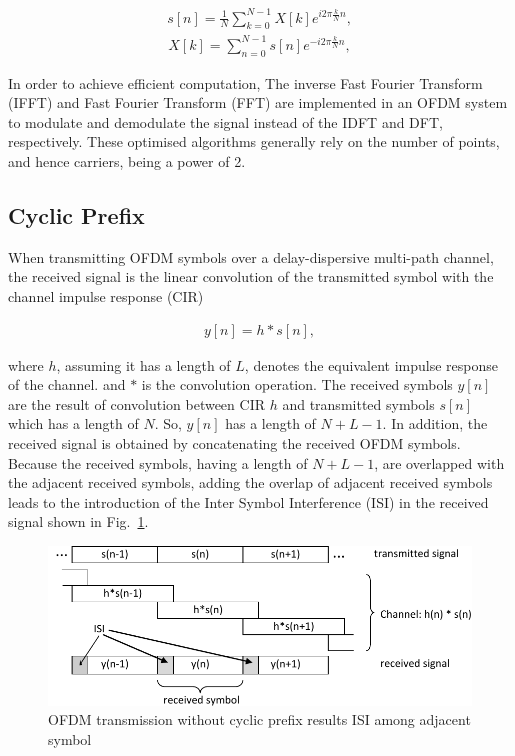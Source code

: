 \begin{eqnarray}
\label{equ:sampledOFDMsignal}
s[n] = \frac{1}{N}\sum_{k=0}^{N-1} X[k] e^{i2\pi\frac{k}{N}n},
\end{eqnarray}
\begin{eqnarray}
\label{equ:sampledOFDMsignal}
X[k] = \sum_{n=0}^{N-1} s[n] e^{-i2\pi\frac{k}{N}n},
\end{eqnarray}

In order to achieve efficient computation, The inverse Fast Fourier Transform (IFFT) and Fast Fourier Transform (FFT) are implemented in an OFDM system to modulate and demodulate the signal instead of the IDFT and DFT, respectively. These optimised algorithms generally rely on the number of points, and hence carriers, being a power of 2.

\subsection{Cyclic Prefix}

When transmitting OFDM symbols over a delay-dispersive multi-path channel, the received signal is the linear convolution of the transmitted symbol with the channel impulse
response (CIR)

\begin{eqnarray}
\label{equ:sampledOFDMsignal}
y[n] = h*s[n],
\end{eqnarray}

where $h$, assuming it has a length of $L$, denotes the equivalent impulse response of the channel. and $*$ is the convolution operation.
The received symbols $y[n]$ are the result of convolution between CIR $h$ and transmitted symbols $s[n]$ which has a length of $N$.
So,  $y[n]$ has a length of $N+L-1$.
In addition, the received signal is obtained by concatenating the received OFDM symbols.
Because the received symbols, having a length of $N+L-1$, are overlapped with the adjacent received symbols, adding the overlap of adjacent received symbols leads to the introduction of the Inter Symbol Interference (ISI) in the received signal shown in Fig.~\ref{fig:CIR-noCP}.


\begin{figure}
	\centerline{\includegraphics [width=0.8\columnwidth] {Figures/CIR_noCP.pdf} }
	\caption{OFDM transmission without cyclic prefix results ISI among adjacent symbol}
	\label{fig:CIR-noCP}
\end{figure}

